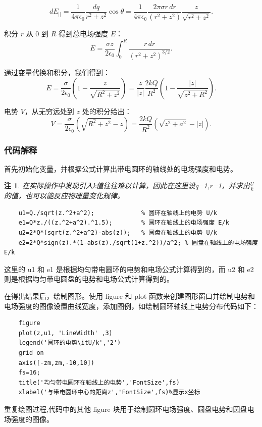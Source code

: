 \documentclass[UTF8]{article}
\numberwithin{figure}{subsection}
\numberwithin{table}{subsection}
\newtheorem{remark}{\indent 注}[subsection]
\begin{document}
\begin{multicols}{2}
    \[ dE_{||} = \frac{1}{4\pi\epsilon_0} \frac{dq}{r^2+z^2} \cos\theta = \frac{1}{4\pi\epsilon_0} \frac{2\pi \sigma r \, dr}{(r^2+z^2)} \frac{z}{\sqrt{r^2+z^2}}. \]
    
    \par 积分 \( r \) 从 0 到 \( R \) 得到总电场强度 \( E \)：
    \[ E = \frac{\sigma z}{2\epsilon_0} \int_0^R \frac{r \, dr}{(r^2+z^2)^{3/2}}. \]
    
    \par 通过变量代换和积分，我们得到：
    \[ E = \frac{\sigma}{2\epsilon_0} \left(1 - \frac{z}{\sqrt{R^2+z^2}}\right) = \frac{z}{|z|} \frac{2kQ}{R^2} (1-\frac{|z|}{\sqrt{z^2+R^2}}). \]
    
    \par 电势 \( V \)，从无穷远处到 \( z \) 处的积分给出：
    \[ V = \frac{\sigma}{2\epsilon_0} \left(\sqrt{R^2+z^2} - z\right) = \frac{2kQ}{R^2} (\sqrt{z^2+a^2}-|z|). \]
    
    \subsubsection{代码解释}
    \par 首先初始化变量，并根据公式计算出带电圆环的轴线处的电场强度和电势。
    \begin{remark}
    	在实际操作中发现引入k值往往难以计算，因此在这里设q=1,r=1，并求出$\frac{U}{k}$的值，也可以能反应物理量变化规律。
    \end{remark}
	\begin{lstlisting}
    u1=Q./sqrt(z.^2+a^2);             % 圆环在轴线上的电势 U/k
    e1=Q*z./((z.^2+a^2).^1.5);        % 圆环在轴线上的电场强度 E/k
    u2=2*Q*(sqrt(z.^2+a^2)-abs(z));   % 圆盘在轴线上的电势 U/k
    e2=2*Q*sign(z).*(1-abs(z)./sqrt(1+z.^2))/a^2; % 圆盘在轴线上的电场强度 E/k
	\end{lstlisting}
    \par 这里的 u1 和 e1 是根据均匀带电圆环的电势和电场公式计算得到的，而 u2 和 e2 则是根据均匀带电圆盘的电势和电场公式计算得到的。
    \par 在得出结果后，绘制图形。使用 figure 和 plot 函数来创建图形窗口并绘制电势和电场强度的图像设置曲线宽度，添加图例，如绘制圆环轴线上电势分布代码如下：
    \begin{lstlisting}
    figure
    plot(z,u1, 'LineWidth' ,3)
    legend('圆环的电势\itU/k','2') 
    grid on
    axis([-zm,zm,-10,10])
    fs=16;
    title('均匀带电圆环在轴线上的电势','FontSize',fs)
    xlabel('与带电圆环中心的距离z','FontSize',fs)%显示x坐标
    \end{lstlisting}
    \par 重复绘图过程,代码中的其他 figure 块用于绘制圆环电场强度、圆盘电势和圆盘电场强度的图像。

\end{multicols}
\end{document}

